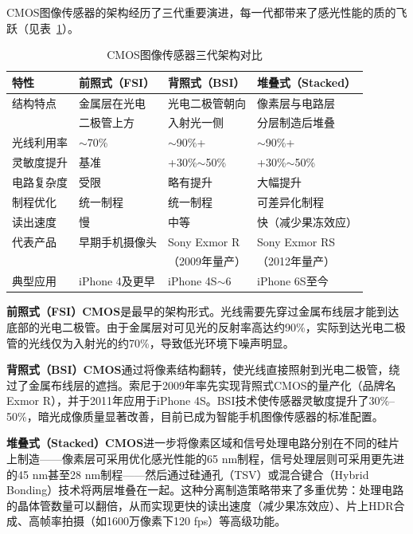 \documentclass[12pt, a4paper]{ctexart}
\begin{document}
CMOS图像传感器的架构经历了三代重要演进，每一代都带来了感光性能的质的飞跃（见表~\ref{tab:cmos_evolution}）。

\begin{table}[H]
\centering
\caption{CMOS图像传感器三代架构对比}
\label{tab:cmos_evolution}
\small
\begin{tabular}{llll}
\toprule
\textbf{特性} & \textbf{前照式（FSI）} & \textbf{背照式（BSI）} & \textbf{堆叠式（Stacked）} \\
\midrule
结构特点 & 金属层在光电 & 光电二极管朝向 & 像素层与电路层 \\
 & 二极管上方 & 入射光一侧 & 分层制造后堆叠 \\
\midrule
光线利用率 & $\sim$70\% & $\sim$90\%+ & $\sim$90\%+ \\
\midrule
灵敏度提升 & 基准 & +30\%$\sim$50\% & +30\%$\sim$50\% \\
\midrule
电路复杂度 & 受限 & 略有提升 & 大幅提升 \\
\midrule
制程优化 & 统一制程 & 统一制程 & 可差异化制程 \\
\midrule
读出速度 & 慢 & 中等 & 快（减少果冻效应） \\
\midrule
代表产品 & 早期手机摄像头 & Sony Exmor R & Sony Exmor RS \\
 & & （2009年量产） & （2012年量产） \\
\midrule
典型应用 & iPhone 4及更早 & iPhone 4S$\sim$6 & iPhone 6S至今 \\
\bottomrule
\end{tabular}
\end{table}

\textbf{前照式（FSI）CMOS}是最早的架构形式。光线需要先穿过金属布线层才能到达底部的光电二极管。由于金属层对可见光的反射率高达约90\%，实际到达光电二极管的光线仅为入射光的约70\%\cite{tencent_cmos}，导致低光环境下噪声明显。

\textbf{背照式（BSI）CMOS}通过将像素结构翻转，使光线直接照射到光电二极管，绕过了金属布线层的遮挡。索尼于2009年率先实现背照式CMOS的量产化（品牌名Exmor R），并于2011年应用于iPhone 4S\cite{csdn_cmos}。BSI技术使传感器灵敏度提升了30\%--50\%，暗光成像质量显著改善，目前已成为智能手机图像传感器的标准配置。

\textbf{堆叠式（Stacked）CMOS}进一步将像素区域和信号处理电路分别在不同的硅片上制造——像素层可采用优化感光性能的65 nm制程，信号处理层则可采用更先进的45 nm甚至28 nm制程——然后通过硅通孔（TSV）或混合键合（Hybrid Bonding）技术将两层堆叠在一起\cite{tencent_cmos}。这种分离制造策略带来了多重优势：处理电路的晶体管数量可以翻倍，从而实现更快的读出速度（减少果冻效应）、片上HDR合成、高帧率拍摄（如1600万像素下120 fps）等高级功能。
\end{document}
